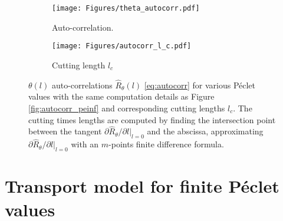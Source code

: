 \begin{figure}[h!]
	\centering
	\begin{subfigure}[b]{0.49\textwidth}
		\centering
		\texttt{[image: Figures/theta\_autocorr.pdf]}
		\caption{Auto-correlation.}
		\label{fig:autocorrt}
	\end{subfigure}
	\hfill
	\begin{subfigure}[b]{0.49\textwidth}
		\centering
	\texttt{[image: Figures/autocorr\_l\_c.pdf]}
	\caption{Cutting length $l_c$}
	\label{fig:autocorr_l_c}
	\end{subfigure}
	\caption{$\theta(l)$ auto-correlations $\hat{R}_\theta(l)$ \eqref{eq:autocorr} for various Péclet values with the same computation details as Figure \ref{fig:autocorr_peinf} and corresponding cutting lengths $l_c$. The cutting times lengths are computed by finding the intersection point between the tangent $\partial\hat{R}_\theta/\partial l|_{l=0}$ and the abscissa, approximating $\partial\hat{R}_\theta/\partial l|_{l=0}$ with an $m$-points finite difference formula.}
	\label{fig:autocorr}
\end{figure}

\section{Transport model for finite Péclet values}

